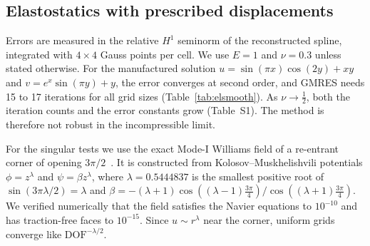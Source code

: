 \documentclass[preprint,12pt]{elsarticle}
\theoremstyle{remark}
\begin{document}
\begin{table}[t]\centering\small
\caption{Wall time in seconds of one solve with $N^2$ unknowns (one CPU core). ``Dense'' is the
classical HWCM approach; the setup of fast diagonalization is done once per grid.}\label{tab:cost}

\end{table}

\subsection{Elastostatics with prescribed displacements}
Errors are measured in the relative $H^1$ seminorm of the reconstructed spline, integrated with
$4\times4$ Gauss points per cell. We use $E=1$ and $\nu=0.3$ unless stated otherwise. For the
manufactured solution $u=\sin(\pi x)\cos(2y)+xy$ and $v=e^x\sin(\pi y)+y$, the error converges at
second order, and GMRES needs 15 to 17 iterations for all grid sizes (Table~\ref{tab:elsmooth}). As
$\nu\to\frac12$, both the iteration counts and the error constants grow (Table~S1). The method
is therefore not robust in the incompressible limit.

\begin{table}[t]\centering\small
\caption{Smooth solution with prescribed displacements on all edges.}\label{tab:elsmooth}

\end{table}

For the singular tests we use the exact Mode-I Williams field of a re-entrant corner of opening
$3\pi/2$~\cite{williams1952stress,grisvard1985elliptic}. It is constructed from Kolosov--Muskhelishvili
potentials $\phi=z^\lambda$ and $\psi=\beta z^\lambda$, where $\lambda=0.5444837$ is the smallest
positive root of $\sin(3\pi\lambda/2)=\lambda$ and
$\beta=-(\lambda+1)\cos((\lambda-1)\tfrac{3\pi}4)/\cos((\lambda+1)\tfrac{3\pi}4)$. We verified numerically
that the field satisfies the Navier equations to $10^{-10}$ and has traction-free faces to $10^{-15}$.
Since $u\sim r^\lambda$ near the corner, uniform grids converge like $\mathrm{DOF}^{-\lambda/2}$.
\end{document}
